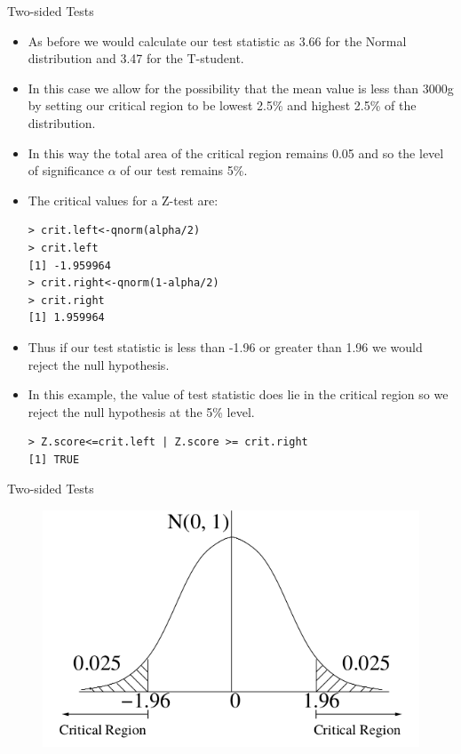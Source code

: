 \documentclass[handout]{beamer}
\begin{document}
\begin{frame}[fragile]{Two-sided Tests}
\scriptsize{
\begin{itemize}
\item As before we would calculate our test statistic as 3.66 for the Normal distribution and 3.47 for the T-student. 
\item In this case we allow for the possibility that the mean value is less than 3000g by setting our critical region
to be lowest 2.5\% and highest 2.5\% of the distribution.
\item In this way the total area of the critical region remains 0.05 and so the level of significance $\alpha$ of our test remains 5\%. 
\item The critical values for a Z-test are:
\begin{verbatim}
> crit.left<-qnorm(alpha/2)
> crit.left
[1] -1.959964
> crit.right<-qnorm(1-alpha/2)
> crit.right
[1] 1.959964 
\end{verbatim}


\item Thus if our test
statistic is less than -1.96 or greater than 1.96 we would reject the null hypothesis.
\item In this example, the value of test statistic does lie in the critical region so we reject the null hypothesis at the 5\% level.
\begin{verbatim}
> Z.score<=crit.left | Z.score >= crit.right
[1] TRUE 
\end{verbatim}


\end{itemize}



} 
\end{frame}

\begin{frame}[fragile]{Two-sided Tests}
\scriptsize{

 \begin{figure}[h!]
	\centering
	\includegraphics[scale=0.47]{pics/critregion2sided.png}
\end{figure}



} 
\end{frame}
\end{document}
